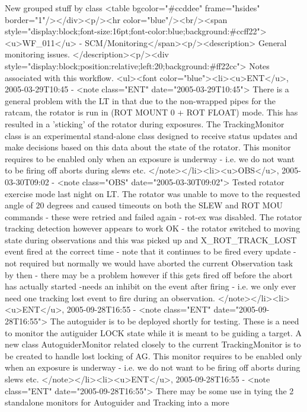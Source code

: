      New grouped stuff by class
     <table bgcolor="#ccddee" frame="hsides" border="1"/></div><p/><hr color="blue"/><br/><span style="display:block;font-size:16pt;font-color:blue;background:#ccff22"><u>WF_011</u> -    SCM/Monitoring</span><p/><description>
	General monitoring issues.
      </description><p/><div style="display:block;position:relative;left:20;background:#ff22cc">
      Notes associated with this workflow.
      <ul><font color="blue"><li><u>ENT</u>, 2005-03-29T10:45 -  <note class="ENT" date="2005-03-29T10:45">
	There is a general problem with the LT in that due to the non-wrapped pipes for the ratcam, the rotator
	is run in (ROT MOUNT 0 + ROT FLOAT) mode. This has resulted in a 'sticking' of the rotator during exposures.
	The TrackingMonitor class is an experimental stand-alone class designed to receive status updates and
	make decisions based on this data about the state of the rotator. This monitor requires to be enabled only
	when an exposure is underway - i.e. we do not want to be firing off aborts during slews etc.
      </note></li><li><u>OBS</u>, 2005-03-30T09:02 -  <note class="OBS" date="2005-03-30T09:02">
	Tested rotator exercise mode last night on LT. The rotator was unable to move to the requested angle
	of 20 degrees and caused timeouts on both the SLEW and ROT MOU commands - these were retried and failed
	again - rot-ex was disabled. The rotator tracking detection however appears to work OK - the rotator switched
	to moving state during observations and this was picked up and X_ROT_TRACK_LOST event fired at the correct time
	- note that it continues to be fired every update - not required but normally we would have aborted the current
	Observation task by then - there may be a problem however if this gets fired off before the abort has actually 
	started -needs an inhibit on the event after firing - i.e. we only ever need one tracking lost event to fire 
	during an observation.
      </note></li><li><u>ENT</u>, 2005-09-28T16:55 -  <note class="ENT" date="2005-09-28T16:55">
	The autoguider is to be deployed shortly for testing. These is a need to monitor the autiguider LOCK state
	while it is meant to be guiding a target. A new class AutoguiderMonitor related closely to the current
	TrackingMonitor is to be created to handle lost locking of AG. This monitor requires to be enabled only
	when an exposure is underway - i.e. we do not want to be firing off aborts during slews etc.
      </note></li><li><u>ENT</u>, 2005-09-28T16:55 -  <note class="ENT" date="2005-09-28T16:55">
	There may be some use in tying the 2 standalone monitors for Autoguider and Tracking into a more
